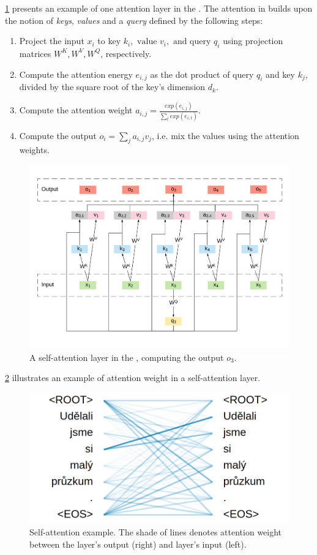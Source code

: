 \cref{fig:self-att-layer} presents an example of one attention layer in the \transformer.
The attention in \transformer builds upon the notion of \textit{keys}, \textit{values} and a \textit{query} defined by the following steps:
\begin{enumerate}
    \item Project the input $x_i$ to key $k_i, \text{ value } v_i, \text{ and query } q_i$ using projection matrices $W^K, W^V, W^Q$, respectively.
    \item Compute the attention energy $e_{i,j}$ as the dot product of query $q_i$ and key $k_j$, divided by the square root of the key's dimension $d_k$.
    \item Compute the attention weight $a_{i,j}=\frac{exp(e_{i,j})}{\sum_{t}exp(e_{i,t})}$.
    \item Compute the output $o_i = \sum_{j} a_{i,j}v_j$, i.e. mix the values using the attention weights.
\end{enumerate}

\begin{figure}[t]
    \centering
    \includegraphics[width=\linewidth]{img/self-att.pdf}
    \caption{A self-attention layer in the \transformer, computing the output $o_3$.}
    \label{fig:self-att-layer}
\end{figure}

\cref{fig:self-att-sample} illustrates an example of attention weight in a self-attention layer.

\begin{figure}[t]
    \centering
    \includegraphics[width=0.6\linewidth]{img/self-att-sample.png}
    \caption{Self-attention example. The shade of lines denotes attention weight between the layer's output (right) and layer's input (left).}
    \label{fig:self-att-sample}
\end{figure}

